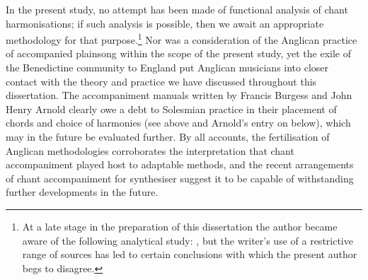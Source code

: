 In the present study, no attempt has been made of functional analysis of chant harmonisations; if such analysis is possible, then we await an appropriate methodology for that purpose.\footnote{At a late stage in the preparation of this dissertation the author became aware of the following analytical study: \cite{ShironishiPlainchantAccompanimentModal2021}, but the writer's use of a restrictive range of sources has led to certain conclusions with which the present author begs to disagree.}
Nor was a consideration of the Anglican practice of accompanied plainsong within the scope of the present study, yet the exile of the Benedictine community to England put Anglican musicians into closer contact with the theory and practice we have discussed throughout this dissertation.
The accompaniment manuals written by Francis Burgess and John Henry Arnold clearly owe a debt to Solesmian practice in their placement of chords and choice of harmonies (see  above and Arnold's entry on  below), which may in the future be evaluated further.
By all accounts, the fertilisation of Anglican methodologies corroborates the interpretation that chant accompaniment played host to adaptable methods, and the recent arrangements of chant accompaniment for synthesiser suggest it to be capable of withstanding further developments in the future.
